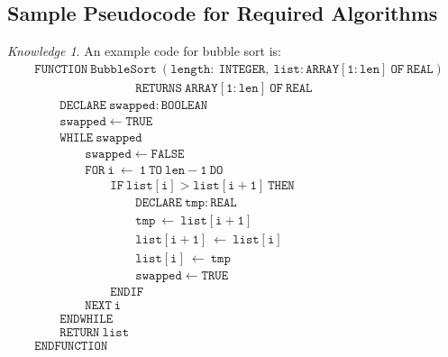 \documentclass[8pt]{article}
\theoremstyle{remark}
\newtheorem{knowledge}{Knowledge}[subsection]
\begin{document}
        \subsection{Sample Pseudocode for Required Algorithms}
            \begin{knowledge}
                An example code for bubble sort is:
                \begin{align*}
                    &\mathtt{FUNCTION\ BubbleSort\ (length:\ INTEGER,\ list:ARRAY [1:len]\ OF\ REAL)}\\
                    &\qquad \qquad \qquad \qquad \mathtt{RETURNS\ ARRAY [1:len]\ OF\ REAL}\\
                    &\qquad \mathtt{DECLARE\ swapped:BOOLEAN}\\
                    &\qquad \mathtt{swapped \leftarrow TRUE}\\
                    &\qquad \mathtt{WHILE\ swapped}\\
                    &\qquad \qquad \mathtt{swapped \leftarrow FALSE}\\
                    &\qquad \qquad \mathtt{FOR\ i\ \leftarrow\ 1\ TO\ len - 1\ DO}\\
                    &\qquad \qquad \qquad \mathtt{IF\ list[i] > list[i + 1]\ THEN}\\
                    &\qquad \qquad \qquad \qquad \mathtt{DECLARE\ tmp:REAL}\\
                    &\qquad \qquad \qquad \qquad \mathtt{tmp\ \leftarrow\ list[i + 1]}\\
                    &\qquad \qquad \qquad \qquad \mathtt{list[i + 1]\ \leftarrow\ list[i]}\\
                    &\qquad \qquad \qquad \qquad \mathtt{list[i]\ \leftarrow\ tmp}\\
                    &\qquad \qquad \qquad \qquad \mathtt{swapped \leftarrow TRUE}\\
                    &\qquad \qquad \qquad \mathtt{ENDIF}\\
                    &\qquad \qquad \mathtt{NEXT\ i}\\
                    &\qquad \mathtt{ENDWHILE}\\
                    &\qquad \mathtt{RETURN\ list}\\
                    &\mathtt{ENDFUNCTION}
                \end{align*}
            \end{knowledge}
\end{document}
